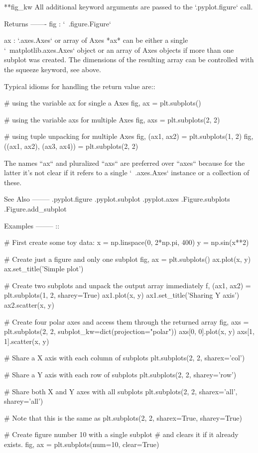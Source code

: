 \begin{DoxyVerb}
**fig_kw
    All additional keyword arguments are passed to the
    `.pyplot.figure` call.

Returns
-------
fig : `~.figure.Figure`

ax : `.axes.Axes` or array of Axes
    *ax* can be either a single `~matplotlib.axes.Axes` object or an
    array of Axes objects if more than one subplot was created.  The
    dimensions of the resulting array can be controlled with the squeeze
    keyword, see above.

    Typical idioms for handling the return value are::

        # using the variable ax for single a Axes
        fig, ax = plt.subplots()

        # using the variable axs for multiple Axes
        fig, axs = plt.subplots(2, 2)

        # using tuple unpacking for multiple Axes
        fig, (ax1, ax2) = plt.subplots(1, 2)
        fig, ((ax1, ax2), (ax3, ax4)) = plt.subplots(2, 2)

    The names ``ax`` and pluralized ``axs`` are preferred over ``axes``
    because for the latter it's not clear if it refers to a single
    `~.axes.Axes` instance or a collection of these.

See Also
--------
.pyplot.figure
.pyplot.subplot
.pyplot.axes
.Figure.subplots
.Figure.add_subplot

Examples
--------
::

    # First create some toy data:
    x = np.linspace(0, 2*np.pi, 400)
    y = np.sin(x**2)

    # Create just a figure and only one subplot
    fig, ax = plt.subplots()
    ax.plot(x, y)
    ax.set_title('Simple plot')

    # Create two subplots and unpack the output array immediately
    f, (ax1, ax2) = plt.subplots(1, 2, sharey=True)
    ax1.plot(x, y)
    ax1.set_title('Sharing Y axis')
    ax2.scatter(x, y)

    # Create four polar axes and access them through the returned array
    fig, axs = plt.subplots(2, 2, subplot_kw=dict(projection="polar"))
    axs[0, 0].plot(x, y)
    axs[1, 1].scatter(x, y)

    # Share a X axis with each column of subplots
    plt.subplots(2, 2, sharex='col')

    # Share a Y axis with each row of subplots
    plt.subplots(2, 2, sharey='row')

    # Share both X and Y axes with all subplots
    plt.subplots(2, 2, sharex='all', sharey='all')

    # Note that this is the same as
    plt.subplots(2, 2, sharex=True, sharey=True)

    # Create figure number 10 with a single subplot
    # and clears it if it already exists.
    fig, ax = plt.subplots(num=10, clear=True)\end{DoxyVerb}
 \mbox{\label{namespacematplotlib_1_1pyplot_a01f04495b119a5ef40533adca5a17d29}} 

